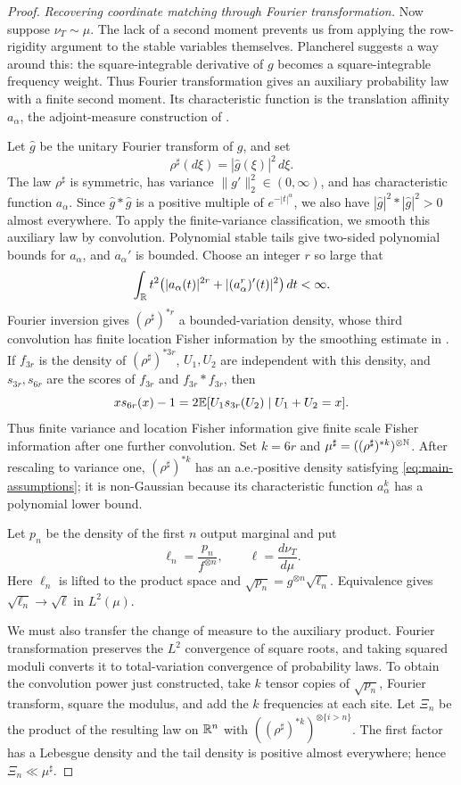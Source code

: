 \begin{proof}
\emph{Recovering coordinate matching through Fourier transformation.}
Now suppose \(\nu_{T}\sim\mu\). The lack of a second moment
prevents us from applying the row-rigidity argument to the stable variables
themselves. Plancherel suggests a way around this: the square-integrable
derivative of \(g\) becomes a square-integrable frequency weight.
Thus Fourier transformation gives an auxiliary probability law with a finite
second moment. Its characteristic function is the translation affinity
\(a_\alpha\), the adjoint-measure construction of
\cite{shimomura1977linear}.

Let \(\widehat g\) be the unitary Fourier transform of \(g\),
and set
\[
 \rho^\sharp(d\xi)=|\widehat g(\xi)|^2\,d\xi.
\]
The law \(\rho^\sharp\) is symmetric, has variance
\(\|g'\|_2^2\in(0,\infty)\), and has characteristic function
\(a_\alpha\).  Since \(\widehat g*\widehat g\) is a positive
multiple of \(e^{-|t|^\alpha}\), we also have
\(|\widehat g|^2*|\widehat g|^2>0\) almost everywhere.
To apply the finite-variance classification, we smooth this auxiliary law
by convolution. Polynomial stable tails give two-sided polynomial bounds for \(a_\alpha\), and
\(a_\alpha'\) is bounded.
Choose an integer \(r\) so large that
\[
 \int_\mathbb R t^2\bigl(|a_\alpha(t)|^{2r}
                 +|(a_\alpha^r)'(t)|^2\bigr)\,dt<\infty.
\]
Fourier inversion gives \((\rho^\sharp)^{*r}\) a bounded-variation density, whose
third convolution has finite location Fisher information by the smoothing
estimate in \cite{bobkov2014stable}.  If \(f_{3r}\) is the density of
\((\rho^\sharp)^{*3r}\), \(U_1,U_2\) are independent with this density, and
\(s_{3r},s_{6r}\) are the scores of \(f_{3r}\) and
\(f_{3r}*f_{3r}\), then
\[
 x s_{6r}(x)-1
 =2\mathbb E[U_1s_{3r}(U_2)\mid U_1+U_2=x].
\]
Thus finite variance and location Fisher information give finite scale Fisher
information after one further convolution.
Set \(k=6r\) and
\(\mu^\sharp=((\rho^\sharp)^{*k})^{\otimes\mathbb N}\).
After rescaling to variance one, \((\rho^\sharp)^{*k}\) has an a.e.-positive density
satisfying \eqref{eq:main-assumptions}; it is non-Gaussian because its
characteristic function \(a_\alpha^k\) has a polynomial lower bound.

Let \(p_n\) be the density of the first \(n\) output marginal and put
\[
 \ell_n=\frac{p_n}{f^{\otimes n}},
 \qquad
 \ell=\frac{d\nu_{T}}{d\mu}.
\]
Here \(\ell_n\) is lifted to the product space and
\(\sqrt{p_n}
  =g^{\otimes n}\sqrt{\ell_n}\).
Equivalence gives
\(\sqrt{\ell_n}\to\sqrt{\ell}\)
in \(L^2(\mu)\).

We must also transfer the change of measure to the auxiliary product.
Fourier transformation preserves the \(L^2\) convergence of square roots,
and taking squared moduli converts it to total-variation convergence of
probability laws. To obtain the convolution power just constructed, take
\(k\) tensor copies of \(\sqrt{p_n}\), Fourier
transform, square the modulus, and add the \(k\) frequencies at each site.
Let \(\Xi_n\) be the product of the resulting law on \(\mathbb R^n\)
with \(((\rho^\sharp)^{*k})^{\otimes\{i>n\}}\).
The first factor has a Lebesgue density and the tail density is positive
almost everywhere; hence
\(\Xi_n\ll\mu^\sharp\).


\end{proof}

